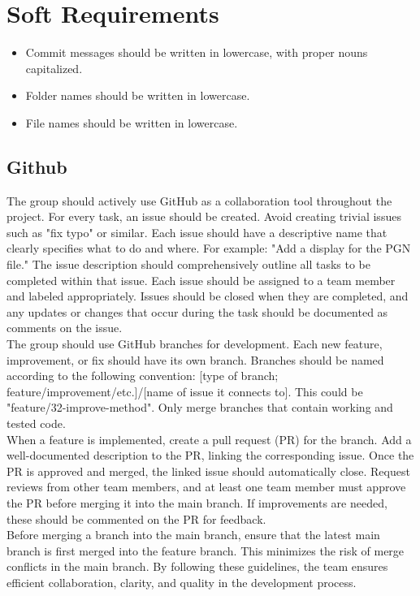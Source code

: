 \chapter{Soft Requirements}

\begin{itemize}
    \item Commit messages should be written in lowercase, with proper nouns capitalized.
    \item Folder names should be written in lowercase.
    \item File names should be written in lowercase.
\end{itemize}

\section{Github}
The group should actively use GitHub as a collaboration tool throughout the project. For every task, an issue should be created. Avoid creating trivial issues such as "fix typo" or similar. Each issue should have a descriptive name that clearly specifies what to do and where. For example: "Add a display for the PGN file." The issue description should comprehensively outline all tasks to be completed within that issue. Each issue should be assigned to a team member and labeled appropriately. Issues should be closed when they are completed, and any updates or changes that occur during the task should be documented as comments on the issue. \\

The group should use GitHub branches for development. Each new feature, improvement, or fix should have its own branch. Branches should be named according to the following convention: [type of branch; feature/improvement/etc.]/[name of issue it connects to]. This could be "feature/32-improve-method". Only merge branches that contain working and tested code. \\

When a feature is implemented, create a pull request (PR) for the branch. Add a well-documented description to the PR, linking the corresponding issue. Once the PR is approved and merged, the linked issue should automatically close. Request reviews from other team members, and at least one team member must approve the PR before merging it into the main branch. If improvements are needed, these should be commented on the PR for feedback.\\

Before merging a branch into the main branch, ensure that the latest main branch is first merged into the feature branch. This minimizes the risk of merge conflicts in the main branch. By following these guidelines, the team ensures efficient collaboration, clarity, and quality in the development process.\\


